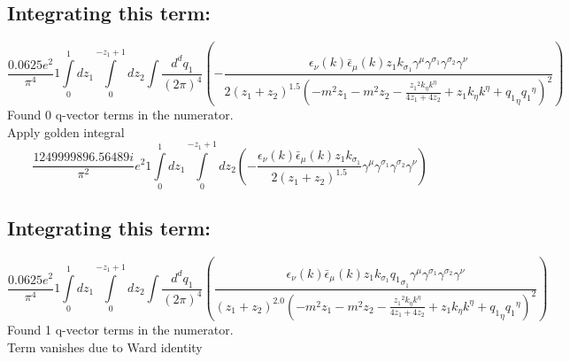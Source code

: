 \subsection*{Integrating this term:}
\begin{dmath}\frac{0.0625 e^{2}}{\pi^{4}}1\int\limits_{ 0 }^{ 1 } d{ z_{ 1 } }\int\limits_{ 0 }^{ - { z_{ 1 } } + 1 } d{ z_{ 2 } }\int\frac{d^d q_1 }{ (2\pi)^4 }\left(- \frac{\epsilon_{ \nu }({ k }) \bar{\epsilon}_{ \mu }({ k }) { z_{ 1 } } { { k }_{ \sigma_1 } } { \gamma^{ \mu } } { \gamma^{ \sigma_1 } } { \gamma^{ \sigma_2 } } { \gamma^{ \nu } }}{2 \left({ z_{ 1 } } + { z_{ 2 } }\right)^{1.5} \left(- m^{2} { z_{ 1 } } - m^{2} { z_{ 2 } } - \frac{{ z_{ 1 } }^{2} { { k }_{ \eta } } { { k }^{ \eta } }}{4 { z_{ 1 } } + 4 { z_{ 2 } }} + { z_{ 1 } } { { k }_{ \eta } } { { k }^{ \eta } } + { { q_1 }_{ \eta } } { { q_1 }^{ \eta } }\right)^{2}}\right)\end{dmath}
Found 0 q-vector terms in the numerator.\\
Apply golden integral
\begin{dmath}\frac{1249999896.56489 i}{\pi^{2}} e^{2}1\int\limits_{ 0 }^{ 1 } d{ z_{ 1 } }\int\limits_{ 0 }^{ - { z_{ 1 } } + 1 } d{ z_{ 2 } }\left(- \frac{\epsilon_{ \nu }({ k }) \bar{\epsilon}_{ \mu }({ k }) { z_{ 1 } } { { k }_{ \sigma_1 } }}{2 \left({ z_{ 1 } } + { z_{ 2 } }\right)^{1.5}} { \gamma^{ \mu } } { \gamma^{ \sigma_1 } } { \gamma^{ \sigma_2 } } { \gamma^{ \nu } }\right)\end{dmath}
\subsection*{Integrating this term:}
\begin{dmath}\frac{0.0625 e^{2}}{\pi^{4}}1\int\limits_{ 0 }^{ 1 } d{ z_{ 1 } }\int\limits_{ 0 }^{ - { z_{ 1 } } + 1 } d{ z_{ 2 } }\int\frac{d^d q_1 }{ (2\pi)^4 }\left(\frac{\epsilon_{ \nu }({ k }) \bar{\epsilon}_{ \mu }({ k }) { z_{ 1 } } { { k }_{ \sigma_1 } } { { q_1 }_{ \sigma_1 } } { \gamma^{ \mu } } { \gamma^{ \sigma_1 } } { \gamma^{ \sigma_2 } } { \gamma^{ \nu } }}{\left({ z_{ 1 } } + { z_{ 2 } }\right)^{2.0} \left(- m^{2} { z_{ 1 } } - m^{2} { z_{ 2 } } - \frac{{ z_{ 1 } }^{2} { { k }_{ \eta } } { { k }^{ \eta } }}{4 { z_{ 1 } } + 4 { z_{ 2 } }} + { z_{ 1 } } { { k }_{ \eta } } { { k }^{ \eta } } + { { q_1 }_{ \eta } } { { q_1 }^{ \eta } }\right)^{2}}\right)\end{dmath}
Found 1 q-vector terms in the numerator.\\
Term vanishes due to Ward identity\\
